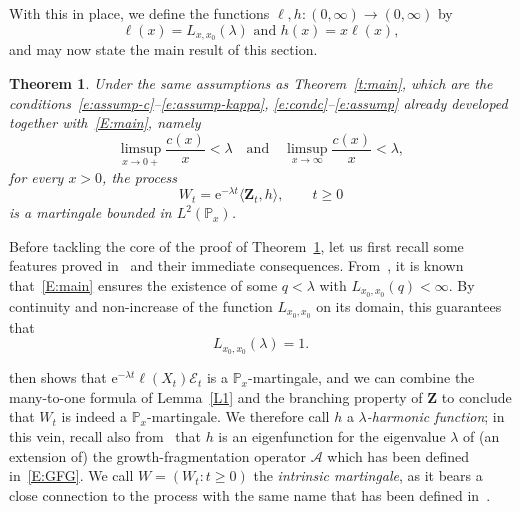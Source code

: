 \documentclass[11pt]{article}
\newtheorem{theo}{Theorem}[section]
\theoremstyle{definition}
\numberwithin{equation}{section}
\numberwithin{figure}{section}
\numberwithin{table}{section}
\newcommand\Zz{\mathbf{Z}}
\newcommand\PP{\mathbb{P}}
\newcommand\from{\colon}
\newcommand\Ee{\mathcal{E}}
\newcommand\e{\mathrm{e}}
\newcommand{\crochet}[1]{{\langle #1 \rangle}}
\begin{document}
With this in place, we define the functions $\ell, h \from (0,\infty) \to (0,\infty)$ by
\[
\ell(x) = L_{x, x_0}(\lambda) \text{ and } h(x) = x \ell(x),
\]
and may now state the main result of this section.

\begin{theo}\label{T1}
Under the same assumptions as Theorem~\ref{t:main}, which are the conditions~\eqref{e:assump-c}--\eqref{e:assump-kappa}, \eqref{e:condc}--\eqref{e:assump} already developed together with~\eqref{E:main}, namely
\begin{equation*}
\limsup _{x\to 0+} \frac{c(x)}{x}< \lambda \quad\text{and}\quad \limsup _{x\to \infty} \frac{c(x)}{x}<\lambda,
\end{equation*}
for every $x>0$, the process
\[
W_t = \e^{-\lambda t} \crochet{\Zz_t, h}, \qquad t\geq 0
\]
is a martingale bounded in $L^2(\PP_x)$.
\end{theo}

Before tackling the core of the proof of Theorem~\ref{T1}, let us first recall some features proved in~\cite{BW,BeFK} and their immediate consequences. From~\cite[Section~3.5]{BeFK}, it is known that~\eqref{E:main} ensures the existence of some $q<\lambda$ with $L_{x_0,x_0}(q)<\infty$. By continuity and non-increase of the function $L_{x_0,x_0}$ on its domain, this guarantees that
\begin{equation}\label{e:assump:malthus}
L_{x_0, x_0}(\lambda)=1.
\end{equation}


\label{s:mart}
\cite[Theorem~4.4]{BW} then shows that $\e^{-\lambda t} \ell(X_t) \Ee_t$ is a $\PP_{x}$-martingale, and we can combine the many-to-one formula of Lemma~\ref{L1} and the branching property of $\Zz$ to conclude that $W_t$ is indeed a $\PP_x$-martingale. We therefore call $h$ a \emph{$\lambda$-harmonic function}; in this vein, recall also from~\cite[Corollary~4.5 and Lemma~4.6]{BW} that $h$ is an eigenfunction for the eigenvalue $\lambda$ of (an extension of) the growth-fragmentation operator ${\mathcal A}$ which has been defined in~\eqref{E:GFG}. We call $W=(W_t: t\geq 0)$ the \emph{intrinsic martingale}, as it bears a close connection to the process with the same name that has been defined in~\cite[Section~5]{Jagers}.
\end{document}
